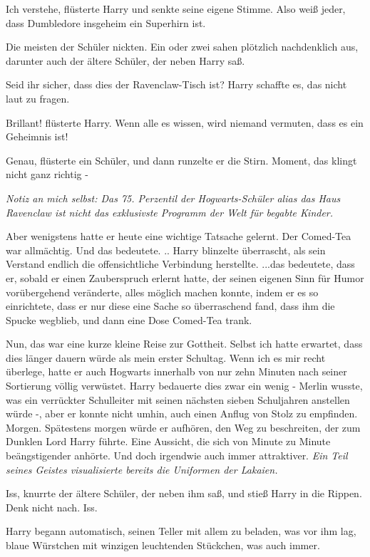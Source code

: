 \glqq Ich verstehe\grqq{}, flüsterte Harry und senkte seine eigene Stimme. \glqq
Also weiß jeder, dass Dumbledore insgeheim ein Superhirn ist.\grqq{}

Die meisten der Schüler nickten. Ein oder zwei sahen plötzlich nachdenklich aus,
darunter auch der ältere Schüler, der neben Harry saß.

Seid ihr sicher, dass dies der Ravenclaw-Tisch ist? Harry schaffte es, das nicht
laut zu fragen.

\glqq Brillant!\grqq{} flüsterte Harry. \glqq Wenn alle es wissen, wird niemand
vermuten, dass es ein Geheimnis ist!\grqq{}

\glqq Genau\grqq{}, flüsterte ein Schüler, und dann runzelte er die Stirn. \glqq
Moment, das klingt nicht ganz richtig -\grqq{}

\emph{Notiz an mich selbst: Das 75. Perzentil der Hogwarts-Schüler alias das
Haus Ravenclaw ist nicht das exklusivste Programm der Welt für begabte Kinder.}

Aber wenigstens hatte er heute eine wichtige Tatsache gelernt. Der Comed-Tea war
allmächtig. Und das bedeutete. .. Harry blinzelte überrascht, als sein Verstand
endlich die offensichtliche Verbindung herstellte. ...das bedeutete, dass er,
sobald er einen Zauberspruch erlernt hatte, der seinen eigenen Sinn für Humor
vorübergehend veränderte, alles möglich machen konnte, indem er es so
einrichtete, dass er nur diese eine Sache so überraschend fand, dass ihm die
Spucke wegblieb, und dann eine Dose Comed-Tea trank.

Nun, das war eine kurze kleine Reise zur Gottheit. Selbst ich hatte erwartet,
dass dies länger dauern würde als mein erster Schultag. Wenn ich es mir recht
überlege, hatte er auch Hogwarts innerhalb von nur zehn Minuten nach seiner
Sortierung völlig verwüstet. Harry bedauerte dies zwar ein wenig - Merlin
wusste, was ein verrückter Schulleiter mit seinen nächsten sieben Schuljahren
anstellen würde -, aber er konnte nicht umhin, auch einen Anflug von Stolz zu
empfinden. Morgen. Spätestens morgen würde er aufhören, den Weg zu beschreiten,
der zum Dunklen Lord Harry führte. Eine Aussicht, die sich von Minute zu Minute
beängstigender anhörte. Und doch irgendwie auch immer attraktiver. \emph{Ein
Teil seines Geistes visualisierte bereits die Uniformen der Lakaien.}

\glqq Iss\grqq{}, knurrte der ältere Schüler, der neben ihm saß, und stieß Harry
in die Rippen. \glqq Denk nicht nach. Iss.\grqq{}

Harry begann automatisch, seinen Teller mit allem zu beladen, was vor ihm lag,
blaue Würstchen mit winzigen leuchtenden Stückchen, was auch immer.


